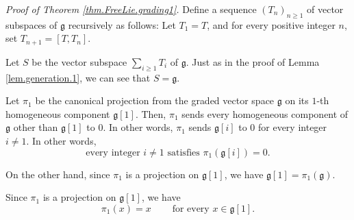 \documentclass[etingof-lie.tex]{subfiles}
\begin{document}
\begin{verlong}
\textit{Proof of Theorem \ref{thm.FreeLie.grading1}.} Define a sequence
$\left(  T_{n}\right)  _{n\geq1}$ of vector subspaces of $\mathfrak{g}$
recursively as follows: Let $T_{1}=T$, and for every positive integer $n$, set
$T_{n+1}=\left[  T,T_{n}\right]  $.

Let $S$ be the vector subspace $\sum\limits_{i\geq1}T_{i}$ of $\mathfrak{g}$.
Just as in the proof of Lemma \ref{lem.generation.1}, we can see that
$S=\mathfrak{g}$.

Let $\pi_{1}$ be the canonical projection from the graded vector space
$\mathfrak{g}$ on its $1$-th homogeneous component $\mathfrak{g}\left[
1\right]  $. Then, $\pi_{1}$ sends every homogeneous component of
$\mathfrak{g}$ other than $\mathfrak{g}\left[  1\right]  $ to $0$. In other
words, $\pi_{1}$ sends $\mathfrak{g}\left[  i\right]  $ to $0$ for every
integer $i\neq1$. In other words,%
\begin{equation}
\text{every integer }i\neq1\text{ satisfies }\pi_{1}\left(  \mathfrak{g}%
\left[  i\right]  \right)  =0. \label{pf.FreeLie.grading1}%
\end{equation}


On the other hand, since $\pi_{1}$ is a projection on $\mathfrak{g}\left[
1\right]  $, we have $\mathfrak{g}\left[  1\right]  =\pi_{1}\left(
\mathfrak{g}\right)  $.

Since $\pi_{1}$ is a projection on $\mathfrak{g}\left[  1\right]  $, we have%
\begin{equation}
\pi_{1}\left(  x\right)  =x\ \ \ \ \ \ \ \ \ \ \text{for every }%
x\in\mathfrak{g}\left[  1\right]  . \label{pf.FreeLie.grading0}%
\end{equation}



\end{verlong}
\end{document}
